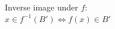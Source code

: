 \documentclass[preview]{standalone}
\begin{document}
\begin{center}
Inverse image under $f$:\\$x\in f^{-1}(B') \Leftrightarrow f(x)\in B'$
\end{center}
\end{document}
